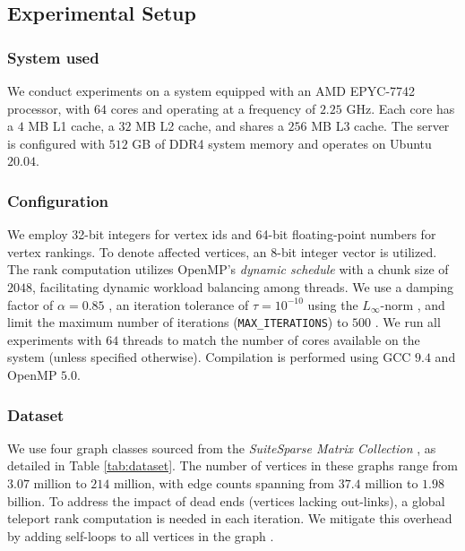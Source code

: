\subsection{Experimental Setup}
\label{sec:setup}

\subsubsection{System used}

We conduct experiments on a system equipped with an AMD EPYC-7742 processor, with $64$ cores and operating at a frequency of $2.25$ GHz. Each core has a $4$ MB L1 cache, a $32$ MB L2 cache, and shares a $256$ MB L3 cache. The server is configured with $512$ GB of DDR4 system memory and operates on Ubuntu $20.04$.


\subsubsection{Configuration}

We employ 32-bit integers for vertex ids and 64-bit floating-point numbers for vertex rankings. To denote affected vertices, an 8-bit integer vector is utilized. The rank computation utilizes OpenMP's \textit{dynamic schedule} with a chunk size of $2048$, facilitating dynamic workload balancing among threads. We use a damping factor of $\alpha = 0.85$ \cite{rank-langville06}, an iteration tolerance of $\tau = 10^{-10}$ using the $L_\infty$-norm \cite{rank-dubey22, rank-plimpton11}, and limit the maximum number of iterations (\texttt{MAX\_ITERATIONS}) to $500$ \cite{nvgraph}. We run all experiments with $64$ threads to match the number of cores available on the system (unless specified otherwise). Compilation is performed using GCC $9.4$ and OpenMP $5.0$.


\subsubsection{Dataset}

We use four graph classes sourced from the \textit{SuiteSparse Matrix Collection} \cite{suite19}, as detailed in Table \ref{tab:dataset}. The number of vertices in these graphs range from $3.07$ million to $214$ million, with edge counts spanning from $37.4$ million to $1.98$ billion. To address the impact of dead ends (vertices lacking out-links), a global teleport rank computation is needed in each iteration. We mitigate this overhead by adding self-loops to all vertices in the graph \cite{rank-andersen07, rank-langville06}.

